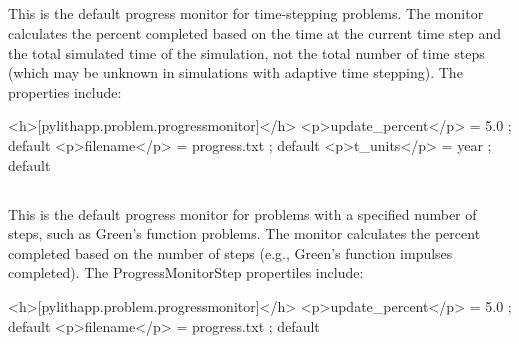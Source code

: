 \subsection{}

This is the default progress monitor for time-stepping problems. The
monitor calculates the percent completed based on the time at the
current time step and the total simulated time of the simulation,
not the total number of time steps (which may be unknown in simulations
with adaptive time stepping). The  properties
include:
\begin{inventory}
\end{inventory}

\begin{cfg}
<h>[pylithapp.problem.progressmonitor]</h>
<p>update_percent</p> = 5.0 ; default
<p>filename</p> = progress.txt ; default
<p>t_units</p> = year ; default
\end{cfg}

\subsection{}

This is the default progress monitor for problems with a specified
number of steps, such as Green's function problems. The monitor calculates
the percent completed based on the number of steps (e.g., Green's
function impulses completed). The ProgressMonitorStep propertiles
include:
\begin{inventory}
\end{inventory}

\begin{cfg}
<h>[pylithapp.problem.progressmonitor]</h>
<p>update_percent</p> = 5.0 ; default
<p>filename</p> = progress.txt ; default
\end{cfg}

